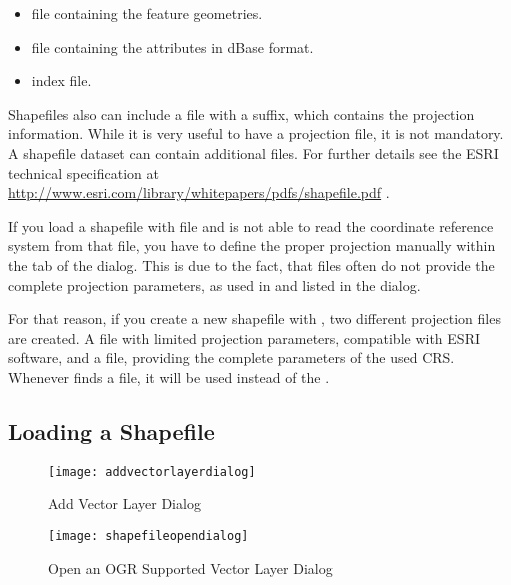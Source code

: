 \begin{itemize}[label=--]
\item {} file containing the feature geometries.
\item {} file containing the attributes in dBase format.
\item {} index file.
\end{itemize}

Shapefiles also can include a file with a  suffix, which contains
the projection information. While it is very useful to have a projection file, it is not mandatory. A shapefile dataset can contain additional files. For further details see the ESRI technical specification at \url{http://www.esri.com/library/whitepapers/pdfs/shapefile.pdf} .


If you load a shapefile with  file and \qg is not
able to read the coordinate reference system from that file, you have to define the
proper projection manually within the  tab of the  dialog. This is due to the fact, that  files often
do not provide the complete projection parameters, as used in \qg and listed in
the  dialog.

For that reason, if you create a new shapefile with \qg, two different projection
files are created. A  file with limited projection parameters,
compatible with ESRI software, and a  file, providing the complete
parameters of the used CRS. Whenever \qg finds a  file, it will be
used instead of the .

\subsection{Loading a Shapefile}\label{sec:load_shapefile}

\begin{figure}[ht]
   \centering
   \texttt{[image: addvectorlayerdialog]}
   \caption{Add Vector Layer Dialog \nixcaption}\label{fig:addvectorlayer}
\end{figure}

\begin{figure}[ht]
   \centering
   \texttt{[image: shapefileopendialog]}
   \caption{Open an OGR Supported Vector Layer Dialog \nixcaption}\label{fig:openshapefile}
\end{figure}

